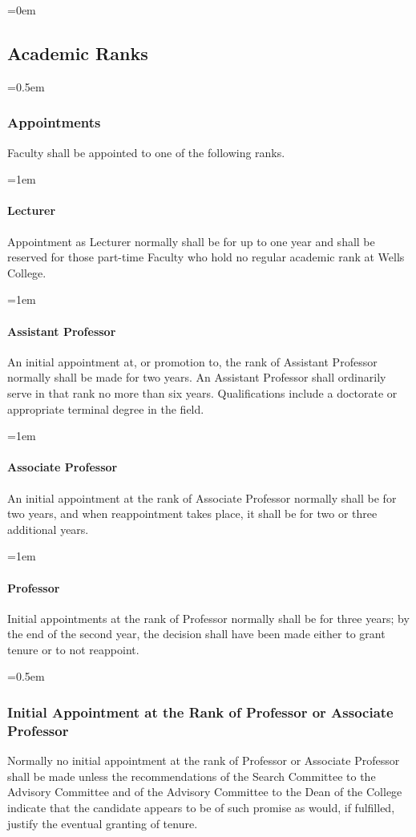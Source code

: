 \documentclass{manual}
\let\oldsubsection\subsection
\renewcommand\subsection{\leftskip=0em\oldsubsection}
\let\oldsubsubsection\subsubsection
\renewcommand\subsubsection{\leftskip=0.5em\oldsubsubsection}
\let\oldparagraph\paragraph
\renewcommand\paragraph{\leftskip=1em\oldparagraph}
\begin{document}
\subsection{Academic Ranks}\label{sec:AcademicRanks}

\subsubsection{Appointments}
Faculty shall be appointed to one of the following ranks.

\paragraph{Lecturer}
Appointment as Lecturer normally shall be for up to one year and shall be reserved for those part-time Faculty who hold no regular academic rank at Wells College.

\paragraph{Assistant Professor}
An initial appointment at, or promotion to, the rank of Assistant Professor normally shall be made for two years. An Assistant Professor shall ordinarily serve in that rank no more than six years. Qualifications include a doctorate or appropriate terminal degree in the field.

\paragraph{Associate Professor}
An initial appointment at the rank of Associate Professor normally shall be for two years, and when reappointment takes place, it shall be for two or three additional years.

\paragraph{Professor}
Initial appointments at the rank of Professor normally shall be for three years; by the end of the second year, the decision shall have been made either to grant tenure or to not reappoint.

\subsubsection{Initial Appointment at the Rank of Professor or Associate Professor}
Normally no initial appointment at the rank of Professor or Associate Professor shall be made unless the recommendations of the Search Committee to the Advisory Committee and of the Advisory Committee to the Dean of the College indicate that the candidate appears to be of such promise as would, if fulfilled, justify the eventual granting of tenure.
\end{document}
